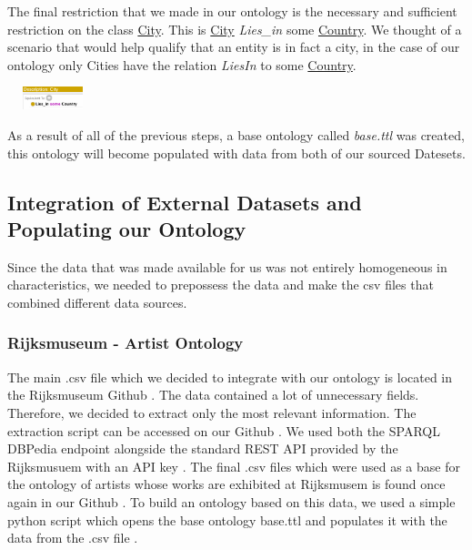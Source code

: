 \documentclass{article}
\begin{document}
\newline
\newline
The final restriction that we made in our ontology is the necessary and sufficient restriction on the class
\underline{City}. This is \underline{City} \textit{Lies\_in} some
\underline{Country}. We thought of a scenario that would help qualify that an entity is in fact a city, in the case of our ontology only Cities have the relation \textit{LiesIn} to some \underline{Country}.
\begin{center}
\includegraphics[height=25, width=100]{third_restriction.png}
\end{center}




As a result of all of the previous steps, a base ontology
called \textit{base.ttl}\cite{base} was created, this ontology will become populated with data from both of our sourced Datesets.

\subsection{Integration of External Datasets and Populating our Ontology}
Since the data that was made available for us was not entirely homogeneous in characteristics, we needed to prepossess the data and make the csv files that combined different data sources.

\subsubsection{Rijksmuseum - Artist Ontology}
The main .csv file which we decided to integrate with our ontology is located in the
Rijksmuseum Github \cite{Third_Github}
. The data contained a lot of unnecessary fields. Therefore, we
decided to extract only the most relevant information. The extraction script can be accessed on our
Github \cite{First_Github}
. We used both the SPARQL DBPedia endpoint alongside the standard REST API
provided by the Rijksmusuem \cite{Rijks_Api}with an API key 
. The final .csv files which were used as a base
for the ontology of artists whose works are exhibited at Rijksmusem is found once again in our
Github \cite{Second_Github}
. To build an ontology based on this data, we used a simple python script which opens
the base ontology base.ttl and populates it with the data from the .csv file \cite{lolGith}.
\end{document}
